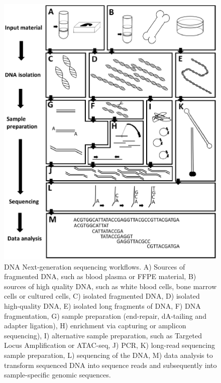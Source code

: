 \begin{figure}
	\includegraphics[width=1.0\linewidth]{img/Introduction_Fig2}
	\caption[DNA Next-generation sequencing workflows]{DNA Next-generation sequencing workflows. A) Sources of fragmented DNA, such as blood plasma or FFPE material, B) sources of high quality DNA, such as white blood cells, bone marrow cells or cultured cells, C) isolated fragmented DNA, D) isolated high-quality DNA, E) isolated long fragments of DNA, F) DNA fragmentation, G) sample preparation (end-repair, dA-tailing and adapter ligation), H) enrichment via capturing or amplicon sequencing), I) alternative sample preparation, such as Targeted Locus Amplification or ATAC-seq, J) PCR, K) long-read sequencing sample preparation, L) sequencing of the DNA, M) data analysis to transform sequenced DNA into sequence reads and subsequently into sample-specific genomic sequences.}
	\label{fig:Introduction_Fig2}
\end{figure}

